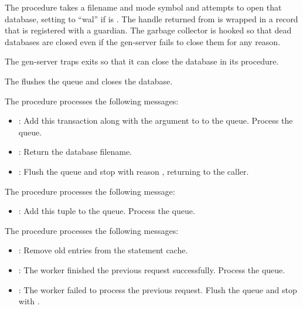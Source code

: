  The  procedure takes a filename and
mode symbol and attempts to open that database, setting
 to ``wal'' if  is
. The handle returned from  is
wrapped in a  record that is registered with a
guardian. The garbage collector is hooked so that dead databases are
closed even if the  gen-server fails to close them for any
reason.

The gen-server traps exits so that it can close the database in its
 procedure.

 The  flushes the queue and
closes the database.

 The  procedure
processes the following messages:

\antipar\begin{itemize}

\item {}: Add this transaction along
  with the  argument to  to the queue.
  Process the queue.

\item {}: Return the database filename.

\item {}: Flush the queue and stop with reason
  , returning  to the caller.

\end{itemize}

 The  procedure
processes the following message:

\antipar\begin{itemize}

\item {}: Add this tuple to
  the queue. Process the queue.

\end{itemize}

 The  procedure
processes the following messages:

\antipar\begin{itemize}

\item {}: Remove old entries from the statement cache.

\item {}: The worker finished
  the previous request successfully. Process the queue.

\item {}: The worker
  failed to process the previous request. Flush the queue and stop
  with .

\end{itemize}


